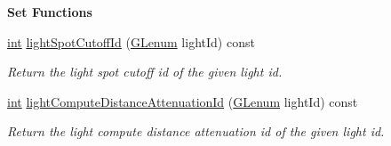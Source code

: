 \begin{Indent}{\bf Set Functions}
\begin{DoxyCompactItemize}
\hyperlink{ioapi_8h_a787fa3cf048117ba7123753c1e74fcd6}{int} \hyperlink{class_g_l_c___shader_af9afe2d2c82772540e5ead62f006356f}{light\-Spot\-Cutoff\-Id} (\hyperlink{glext_8h_a508b2dec21679e2e346cad3e0d1969bf}{G\-Lenum} light\-Id) const 
\begin{DoxyCompactList}\small\item\em Return the light spot cutoff id of the given light id. \end{DoxyCompactList}\item 
\hyperlink{ioapi_8h_a787fa3cf048117ba7123753c1e74fcd6}{int} \hyperlink{class_g_l_c___shader_aefdeb4c813554c3868dd2e68c06f4122}{light\-Compute\-Distance\-Attenuation\-Id} (\hyperlink{glext_8h_a508b2dec21679e2e346cad3e0d1969bf}{G\-Lenum} light\-Id) const 
\begin{DoxyCompactList}\small\item\em Return the light compute distance attenuation id of the given light id. \end{DoxyCompactList}\end{DoxyCompactItemize}
\end{Indent}
